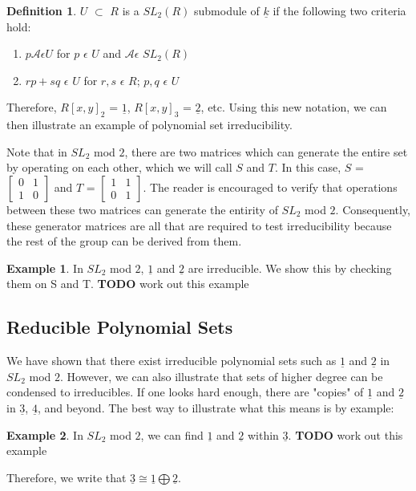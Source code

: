 \documentclass[a4paper,draft]{amsproc}
\theoremstyle{plain}
\theoremstyle{definition}
\newtheorem{exm}{Example}[section]
\newtheorem{dfn}{Definition}[section]
\theoremstyle{remark}
\numberwithin{equation}{section}
\begin{document}
\begin{dfn}
$U$ $\subset$ $R$ is a  $SL_{2}(R)$ submodule of $\underline{k}$ if the following two criteria hold: 

\begin{enumerate}
  \item $p  \mathcal{A} \epsilon U$ for $p$ $\epsilon$ $U$ and $\mathcal{A} \epsilon$ $SL_{2}(R)$ 
  \item $rp + sq$ $\epsilon$ $U$ for $r, s$ $\epsilon$ $R$; $p, q$ $\epsilon$ $U$
\end{enumerate}

\end{dfn}
Therefore, $R[x,y]_{2}$ = $\underline{1}$, $R[x,y]_{3}$ = $\underline{2}$, etc. Using this new notation, we can then illustrate an example of polynomial set irreducibility. 

Note that in $SL_{2}$ mod $2$, there are two matrices which can generate the entire set by operating on each other, which we will call $S$ and $T$. In this case, $S$ = 
$\begin{bmatrix}
 0&1 \\ 
 1&0 
\end{bmatrix}$ and $T$ = $\begin{bmatrix}
 1&1 \\ 
 0&1 
\end{bmatrix}$. The reader is encouraged to verify that operations between these two matrices can generate the entirity of $SL_{2}$ mod $2$. Consequently, these generator matrices are all that are required to test irreducibility because the rest of the group can be derived from them. 

\begin{exm}
In  $SL_{2}$ mod $2$, $\underline{1}$ and $\underline{2}$ are irreducible. We show this by checking them on S and T. 
\textbf{TODO} work out this example
\end{exm}

\subsection{Reducible Polynomial Sets}
We have shown that there exist irreducible polynomial sets such as $\underline{1}$ and $\underline{2}$ in  $SL_{2}$ mod $2$. However, we can also illustrate that sets of higher degree can be condensed to irreducibles. If one looks hard enough, there are "copies" of $\underline{1}$ and $\underline{2}$ in $\underline{3}$, $\underline{4}$, and beyond. The best way to illustrate what this means is by example: 
\begin{exm}
In  $SL_{2}$ mod $2$, we can find $\underline{1}$ and $\underline{2}$ within $\underline{3}$. 
\textbf{TODO} work out this example

Therefore, we write that $\underline{3} \cong \underline{1} \bigoplus \underline{2}$. 
\end{exm}
\end{document}

